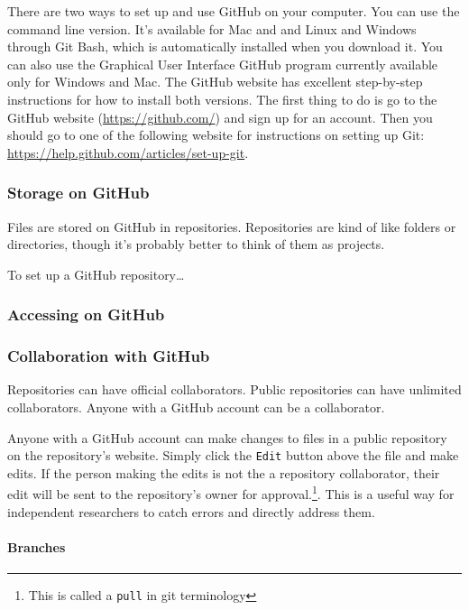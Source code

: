 There are two ways to set up and use GitHub on your computer. You can use the command line version. It's available for Mac and and Linux and Windows through Git Bash, which is automatically installed when you download it. You can also use the Graphical User Interface GitHub program currently available only for Windows and Mac. The GitHub website has excellent step-by-step instructions for how to install both versions. The first thing to do is go to the GitHub website (\url{https://github.com/}) and sign up for an account. Then you should go to one of the following website for instructions on setting up Git: \url{https://help.github.com/articles/set-up-git}.

\subsubsection{Storage on GitHub}


Files are stored on GitHub in repositories. Repositories are kind of like folders or directories, though it's probably better to think of them as projects.

To set up a GitHub repository\ldots

\subsubsection{Accessing on GitHub}

\subsubsection{Collaboration with GitHub}

Repositories can have official collaborators. Public repositories can have unlimited collaborators. Anyone with a GitHub account can be a collaborator. 
 

Anyone with a GitHub account can make changes to files in a public repository on the repository's website. Simply click the \texttt{Edit} button above the file and make edits. If the person making the edits is not the a repository collaborator, their edit will be sent to the repository's owner for approval.\footnote{This is called a \texttt{pull} in git terminology}. This is a useful way for independent researchers to catch errors and directly address them.

\paragraph{Branches}

